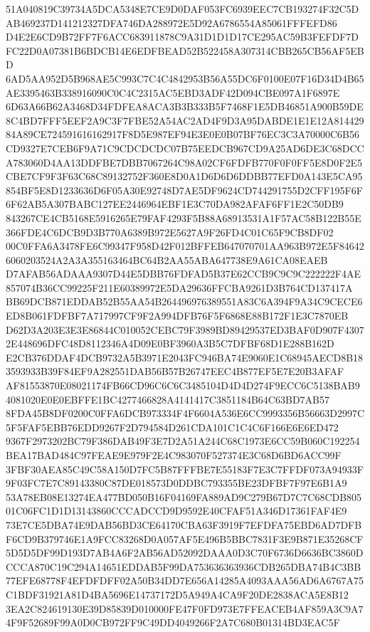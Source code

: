 \documentclass[UTF8,fontset=fandol,zihao=-4,a4paper]{ctexart}
\begin{document}
{{51A040819C39734A5DCA5348E7CE9D0DAF053FC6939EEC7CB193274F32C5DAB469237D141212327DFA746DA288972E5D92A6786554A85061FFFEFD86
D4E2E6CD9B72FF7F6ACC683911878C9A31D1D1D17CE295AC59B3FEFDF7DFC22D0A07381B6BDCB14E6EDFBEAD52B522458A307314CBB265CB56AF5EBD
6AD5AA952D5B968AE5C993C7C4C4842953B56A55DC6F0100E07F16D34D4B65AE3395463B338916090C0C4C2315AC5EBD3ADF42D094CBE097A1F6897E
6D63A66B62A3468D34FDFEA8ACA3B3B333B5F7468F1E5DB46851A900B59DE8C4BD7FFF5EEF2A9C3F7FBE52A54AC2AD4F9D3A95DABDE1E1E12A814429
84A89CE724591616162917F8D5E987EF94E3E0E0B07BF76EC3C3A70000C6B56CD9327E7CEB6F9A71C9CDCDCDC07B75EEDCB967CD9A25AD6DE3C68DCC
A783060D4AA13DDFBE7DBB7067264C98A02CF6FDFB770F0F0FF5E8D0F2E5CBE7CF9F3F63C68C89132752F360E8D0A1D6D6D6DDBB77EFD0A143E5CA95
854BF5E8D1233636D6F05A30E92748D7AE5DF9624CD744291755D2CFF195F6F6F62AB5A307BABC127EE2446964EBF1E3C70DA982AFAF6FF1E2C50DB9
843267CE4CB5168E5916265E79FAF4293F5B88A68913531A1F57AC58B122B55E366FDE4C6DCB9D3B770A6389B972E5627A9F26FD4C01C65F9CB8DF02
00C0FFA6A3478FE6C99347F958D42F012BFFEB647070701AA963B972E5F846426060203524A2A3A355163464BC64B2AA55ABA647738E9A61CA08EAEB
D7AFAB56ADAAA9307D44E5DBB76FDFAD5B37E62CCB9C9C9C222222F4AE857074B36CC99225F211E60389972E5DA29636FFCBA9261D3B764CD137417A
BB69DCB871EDDAB52B55AA54B264496976389551A83C6A394F9A34C9CECE6ED8B061FDFBF7A717997CF9F2A994DFB76F5F6868E88B172F1E3C7870EB
D62D3A203E3E3E86844C010052CEBC79F3989BD89429537ED3BAF0D907F43072E448696DFC48D8112346A4D09E0BF3960A3B5C7DFBF68D1E288B162D
E2CB376DDAF4DCB9732A5B3971E2043FC946BA74E9060E1C68945AECD8B183593933B39F84EF9A282551DAB56B57B26747EEC4B877EF5E7E20B3AFAF
AF81553870E08021174FB66CD96C6C6C3485104D4D4D274F9ECC6C5138BAB94081020E0E0EBFFE1BC4277466828A4141417C3851184B64C63BD7AB57
8FDA45B8DF0200C0FFA6DCB973334F4F6604A536E6CC9993356B56663D2997C5F5FAF5EBB76EDD9267F2D794584D261CDA101C1C4C6F166E6E6ED472
9367F2973202BC79F386DAB49F3E7D2A51A244C68C1973E6CC59B060C192254BEA17BAD484C97FEAE9E979F2E4C983070F527374E3C68D6BD6ACC99F
3FBF30AEA85C49C58A150D7FC5B87FFFBE7E55183F7E3C7FFDF073A94933F9F03FC7E7C89143380C87DE018573D0DDBC793355BE23DFBF7F97E6B1A9
53A78EB08E13274EA477BD050B16F04169FA889AD9C279B67D7C7C68CDB80501C06FC1D1D13143860CCCADCCD9D9592E40CFAF51A346D17361FAF4E9
73E7CE5DBA74E9DAB56BD3CE64170CBA63F3919F7EFDFA75EBD6AD7DFBF6CD9B379746E1A9FCC83268D0A057AF5E496B5BBC7831F3E9B871E35268CF
5D5D5DF99D193D7AB4A6F2AB56AD52092DAAA0D3C70F6736D6636BC3860DCCCA870C19C294A14651EDDAB5F99DA753636363936CDB265DBA74B4C3BB
77EFE68778F4EFDFDFF02A50B34DD7E656A14285A4093AAA56AD6A6767A75C1BDF31921A81D4BA5696E14737172D5A949A4CA9F20DE2838ACA5E8B12
3EA2C824619130E39D85839D010000FE47F0FD973E7FFEACEB4AF859A3C9A74F9F52689F99A0D0CB972FF9C49DD4049266F2A7C680B01314BD3EAC5F
}}
\end{document}
